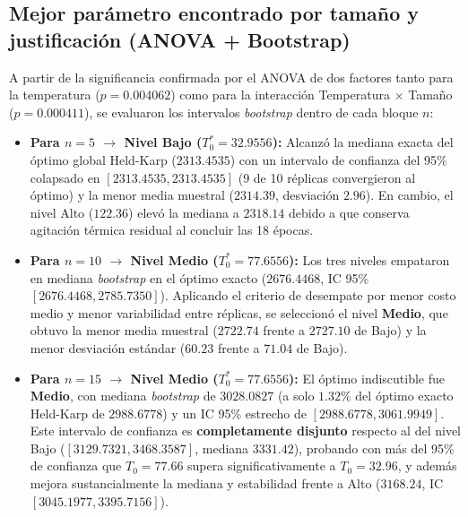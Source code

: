 \documentclass[11pt,letterpaper]{article}
\begin{document}
\subsection{\color{cafeuanl} Mejor parámetro encontrado por tamaño y justificación (ANOVA + Bootstrap)}
A partir de la significancia confirmada por el ANOVA de dos factores tanto para la temperatura ($p = 0.004062$) como para la interacción Temperatura $\times$ Tamaño ($p = 0.000411$), se evaluaron los intervalos \textit{bootstrap} dentro de cada bloque $n$:
\begin{itemize}
    \item \textbf{Para $n = 5$ $\rightarrow$ Nivel Bajo ($T_0^* = 32.9556$):} Alcanzó la mediana exacta del óptimo global Held-Karp ($2313.4535$) con un intervalo de confianza del 95\% colapsado en $[2313.4535, 2313.4535]$ (9 de 10 réplicas convergieron al óptimo) y la menor media muestral ($2314.39$, desviación $2.96$). En cambio, el nivel Alto ($122.36$) elevó la mediana a $2318.14$ debido a que conserva agitación térmica residual al concluir las 18 épocas.
    \item \textbf{Para $n = 10$ $\rightarrow$ Nivel Medio ($T_0^* = 77.6556$):} Los tres niveles empataron en mediana \textit{bootstrap} en el óptimo exacto ($2676.4468$, IC 95\% $[2676.4468, 2785.7350]$). Aplicando el criterio de desempate por menor costo medio y menor variabilidad entre réplicas, se seleccionó el nivel \textbf{Medio}, que obtuvo la menor media muestral ($2722.74$ frente a $2727.10$ de Bajo) y la menor desviación estándar ($60.23$ frente a $71.04$ de Bajo).
    \item \textbf{Para $n = 15$ $\rightarrow$ Nivel Medio ($T_0^* = 77.6556$):} El óptimo indiscutible fue \textbf{Medio}, con mediana \textit{bootstrap} de $3028.0827$ (a solo $1.32\%$ del óptimo exacto Held-Karp de $2988.6778$) y un IC 95\% estrecho de $[2988.6778, 3061.9949]$. Este intervalo de confianza es \textbf{completamente disjunto} respecto al del nivel Bajo ($[3129.7321, 3468.3587]$, mediana $3331.42$), probando con más del 95\% de confianza que $T_0 = 77.66$ supera significativamente a $T_0 = 32.96$, y además mejora sustancialmente la mediana y estabilidad frente a Alto ($3168.24$, IC $[3045.1977, 3395.7156]$).
\end{itemize}
\end{document}
